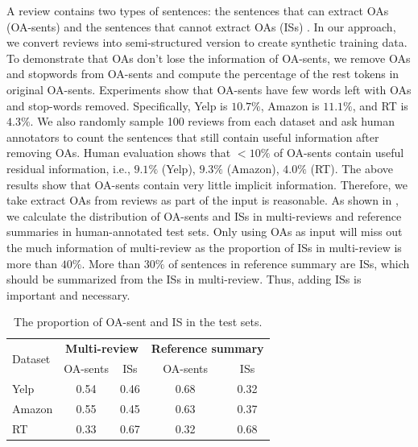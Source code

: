 A review contains two types of sentences: the sentences  that can extract OAs (OA-sents) and the sentences that cannot extract OAs  (ISs) .
In our approach, we convert reviews into semi-structured version
to create synthetic training data.
To demonstrate that OAs don't lose the information of OA-sents,
we remove OAs and stopwords from OA-sents and compute the percentage of the rest tokens in original OA-sents. 
Experiments show that OA-sents have few words left 
with OAs and stop-words removed. 
Specifically, Yelp is $10.7\%$, Amazon is $11.1\%$, and RT is $4.3\%$. 
We also randomly sample 100 reviews from each dataset and ask human annotators to count the sentences that still contain useful information after removing OAs.
Human evaluation shows that $<10\%$ of OA-sents contain useful residual information, i.e., $9.1\%$ (Yelp), $9.3\%$ (Amazon), $4.0\%$ (RT).
The above results show that OA-sents contain very little implicit information.
Therefore, we take extract OAs from reviews as part of the input is reasonable.
As shown in , 
we calculate the distribution of OA-sents and ISs in multi-reviews and reference summaries in human-annotated test sets.
Only using OAs as input will miss out the much information of multi-review
as the proportion of ISs in multi-review is more than $40\%$.
More than $30\%$ of sentences in reference summary are ISs, which should be summarized from the ISs in multi-review.
Thus, adding ISs is important and necessary.
\begin{table}[th]
	\small
	\centering
	\begin{tabular}{|l|cc|cc|}
		\hline
		\multirow{2}{*}{Dataset}&\multicolumn{2}{c|}{\textbf{Multi-review}}&\multicolumn{2}{c|}{\textbf{Reference summary}} \\ \cline{2-5}
		&OA-sents & ISs & OA-sents & ISs \\
		\hline
		Yelp & 0.54& 0.46&0.68 &0.32\\
		Amazon &  0.55&0.45&0.63&0.37\\
		RT &  0.33&0.67&0.32&0.68\\
		\hline
	\end{tabular}
	\caption{The proportion of OA-sent and IS in the test sets.}
	\label{tab:OAIS}
\end{table}

